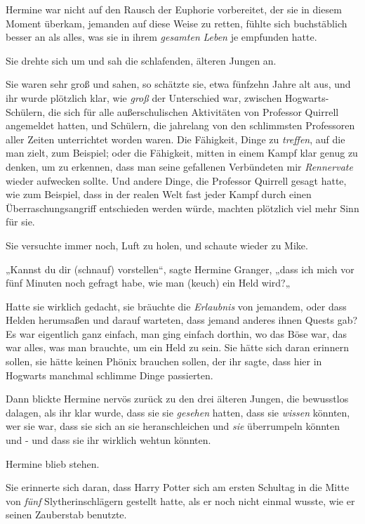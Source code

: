 {Hermine war nicht auf den Rausch der Euphorie vorbereitet, der sie in diesem Moment überkam, jemanden auf diese Weise zu retten, fühlte sich buchstäblich besser an als alles, was sie in ihrem \emph{gesamten} \emph{Leben} je empfunden hatte.

Sie drehte sich um und sah die schlafenden, älteren Jungen an.

Sie waren sehr groß und sahen, so schätzte sie, etwa fünfzehn Jahre alt aus, und ihr wurde plötzlich klar, wie \emph{groß} der Unterschied war, zwischen Hogwarts-Schülern, die sich für alle außerschulischen Aktivitäten von Professor Quirrell angemeldet hatten, und Schülern, die jahrelang von den schlimmsten Professoren aller Zeiten unterrichtet worden waren. Die Fähigkeit, Dinge zu \emph{treffen}, auf die man zielt, zum Beispiel; oder die Fähigkeit, mitten in einem Kampf klar genug zu denken, um zu erkennen, dass man seine gefallenen Verbündeten mir \emph{Rennervate} wieder aufwecken sollte. Und andere Dinge, die Professor Quirrell gesagt hatte, wie zum Beispiel, dass in der realen Welt fast jeder Kampf durch einen Überraschungsangriff entschieden werden würde, machten plötzlich viel mehr Sinn für sie.

Sie versuchte immer noch, Luft zu holen, und schaute wieder zu Mike.

„Kannst du dir (schnauf) vorstellen“, sagte Hermine Granger, „dass ich mich vor fünf Minuten noch gefragt habe, wie man (keuch) ein Held wird?„

Hatte sie wirklich gedacht, sie bräuchte die \emph{Erlaubnis} von jemandem, oder dass Helden herumsaßen und darauf warteten, dass jemand anderes ihnen Quests gab? Es war eigentlich ganz einfach, man ging einfach dorthin, wo das Böse war, das war alles, was man brauchte, um ein Held zu sein. Sie hätte sich daran erinnern sollen, sie hätte keinen Phönix brauchen sollen, der ihr sagte, dass hier in Hogwarts manchmal schlimme Dinge passierten.

Dann blickte Hermine nervös zurück zu den drei älteren Jungen, die bewusstlos dalagen, als ihr klar wurde, dass sie sie \emph{gesehen} hatten, dass sie \emph{wissen} könnten, wer sie war, dass sie sich an sie heranschleichen und \emph{sie} überrumpeln könnten und - und dass sie ihr wirklich wehtun könnten.

Hermine blieb stehen.

Sie erinnerte sich daran, dass Harry Potter sich am ersten Schultag in die Mitte von \emph{fünf} Slytherinschlägern gestellt hatte, als er noch nicht einmal wusste, wie er seinen Zauberstab benutzte.

}
